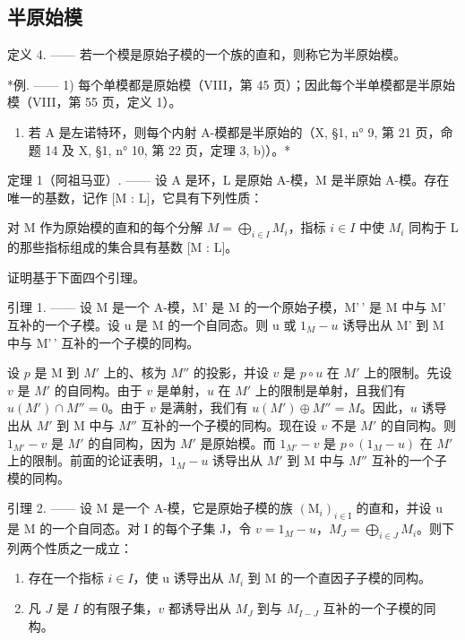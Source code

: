 \subsection{半原始模}

定义 4. —— 若一个模是原始子模的一个族的直和，则称它为半原始模。

*例. —— 1) 每个单模都是原始模（VIII，第 45 页）；因此每个半单模都是半原始模（VIII，第 55 页，定义 1）。

\begin{enumerate}
\def\labelenumi{\arabic{enumi})}
\setcounter{enumi}{1}
\tightlist
\item
  若 A 是左诺特环，则每个内射 A-模都是半原始的（X, §1, n° 9, 第 21 页，命题 14 及 X, §1, n° 10, 第 22 页，定理 3, b)）。*
\end{enumerate}

定理 1（阿祖马亚）. —— 设 A 是环，L 是原始 A-模，M 是半原始 A-模。存在唯一的基数，记作 {[}M : L{]}，它具有下列性质：

对 M 作为原始模的直和的每个分解 \(M = \bigoplus_{i \in I} M_i\)，指标 \(i \in I\) 中使 \(M_i\) 同构于 L 的那些指标组成的集合具有基数 {[}M : L{]}。

证明基于下面四个引理。

引理 1. —— 设 M 是一个 A-模，M' 是 M 的一个原始子模，M'\,' 是 M 中与 M' 互补的一个子模。设 u 是 M 的一个自同态。则 u 或 \(1_{M} - u\) 诱导出从 M' 到 M 中与 M'\,' 互补的一个子模的同构。

设 \(p\) 是 M 到 \(M'\) 上的、核为 \(M''\) 的投影，并设 \(v\) 是 \(p \circ u\) 在 \(M'\) 上的限制。先设 \(v\) 是 \(M'\) 的自同构。由于 \(v\) 是单射，\(u\) 在 \(M'\) 上的限制是单射，且我们有 \(u(M') \cap M'' = 0\)。由于 \(v\) 是满射，我们有 \(u(M') \oplus M'' = M\)。因此，\(u\) 诱导出从 \(M'\) 到 M 中与 \(M''\) 互补的一个子模的同构。现在设 \(v\) 不是 \(M'\) 的自同构。则 \(1_{M'} - v\) 是 \(M'\) 的自同构，因为 \(M'\) 是原始模。而 \(1_{M'} - v\) 是 \(p \circ (1_M - u)\) 在 \(M'\) 上的限制。前面的论证表明，\(1_M - u\) 诱导出从 \(M'\) 到 M 中与 \(M''\) 互补的一个子模的同构。

引理 2. —— 设 M 是一个 A-模，它是原始子模的族 \((\mathrm{M}_{i})_{i\in\mathrm{I}}\) 的直和，并设 u 是 M 的一个自同态。对 I 的每个子集 J，令 \(v=1_{M}-u\)，\(M_{J}=\bigoplus_{i\in J}M_{i}\)。则下列两个性质之一成立：

\begin{enumerate}
\def\labelenumi{\alph{enumi})}
\item
  存在一个指标 \(i \in I\)，使 u 诱导出从 \(M_{i}\) 到 M 的一个直因子子模的同构。
\item
  凡 \(J\) 是 \(I\) 的有限子集，\(v\) 都诱导出从 \(M_J\) 到与 \(M_{I-J}\) 互补的一个子模的同构。
\end{enumerate}

